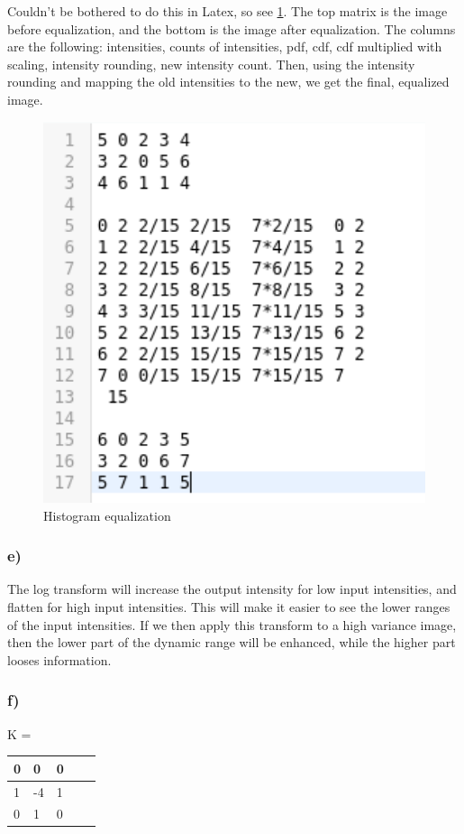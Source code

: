 Couldn't be bothered to do this in Latex, so see \cref{fig:equalizer}. The top matrix is the image before equalization, and the bottom is the image after equalization. The columns are the following: intensities, counts of intensities, pdf, cdf, cdf multiplied with scaling, intensity rounding, new intensity count. Then, using the intensity rounding and mapping the old intensities to the new, we get the final, equalized image. 
\begin{figure}[]
    \centering
    \includegraphics[width=1.00\textwidth]{figures/histogram_equalizer.png}
    \caption{Histogram equalization}
    \label{fig:equalizer}
\end{figure}

\subsubsection*{e)}
The log transform will increase the output intensity for low input intensities, and flatten for high input intensities. This will make it easier to see the lower ranges of the input intensities. If we then apply this transform to a high variance image, then the lower part of the dynamic range will be enhanced, while the higher part looses information. 
%
%
%

\subsubsection*{f)}
\begin{table}[]
    \label{tab:kernel}
    K = \begin{tabular}{|l|l|l|l|l|}
        \hline
        0 & 0 & 0 \\ \hline
        1 &-4 & 1 \\ \hline
        0 & 1 & 0 \\ \hline
    \end{tabular}
\end{table}

